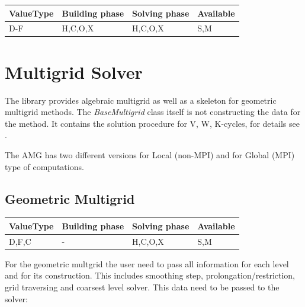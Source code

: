 \begin{table}[H]
\begin{tabular}{l|l|l|l}
\multicolumn{1}{c|}{ValueType} & Building phase & Solving phase & Available \\ \hline
D-F                            & H,C,O,X        & H,C,O,X       & S,M      
\end{tabular}
\end{table}




\section{Multigrid Solver}

The library provides algebraic multigrid as well as a skeleton for geometric multigrid methods. The \emph{BaseMultigrid} class itself is not constructing the data for the method. It contains the solution procedure for V, W, K-cycles, for details see \cite{Trottenberg2003}. 

The AMG has two different versions for Local (non-MPI) and for Global (MPI) type of computations.

\subsection{Geometric Multigrid}

\begin{table}[H]
\begin{tabular}{l|l|l|l}
\multicolumn{1}{c|}{ValueType} & Building phase & Solving phase & Available \\ \hline
D,F,C                          & -              & H,C,O,X       & S,M      
\end{tabular}
\end{table}

For the geometric multgrid the user need to pass all information for each level and for its construction. This includes smoothing step, prolongation/restriction, grid traversing and coarsest level solver. This data need to be passed to the solver:

